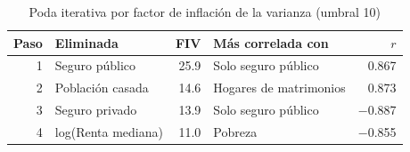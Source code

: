 \begin{table}[htbp]
\centering
\small
\caption{Poda iterativa por factor de inflación de la varianza (umbral 10)}\label{tab:poda}
\begin{tabularx}{\linewidth}{r >{\raggedright\arraybackslash}X r >{\raggedright\arraybackslash}X r}
\toprule
Paso & Eliminada & FIV & Más correlada con & $r$ \\
\midrule
1 & Seguro público & \num{25.9} & Solo seguro público & \num{0.867} \\
2 & Población casada & \num{14.6} & Hogares de matrimonios & \num{0.873} \\
3 & Seguro privado & \num{13.9} & Solo seguro público & \num{-0.887} \\
4 & log(Renta mediana) & \num{11.0} & Pobreza & \num{-0.855} \\
\bottomrule
\end{tabularx}
\par{}
\end{table}
